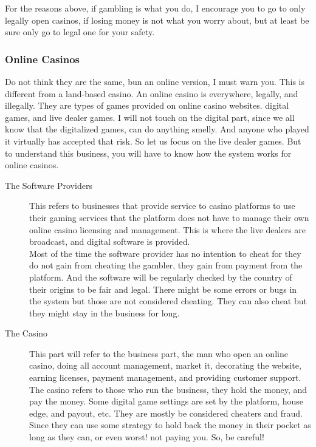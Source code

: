 \documentclass{article}
\begin{document}
For the reasons above, if gambling is what you do, I encourage you to go to only legally open casinos, if losing money is not what you worry about, but at least be sure only go to legal one for your safety.\\

\subsubsection{Online Casinos}
Do not think they are the same, bun an online version, I must warn you. This is different from a land-based casino.  An online casino is everywhere, legally, and illegally.  They are types of games provided on online casino websites. digital games, and live dealer games.  I will not touch on the digital part, since we all know that the digitalized games, can do anything smelly.  And anyone who played it virtually has accepted that risk.  So let us focus on the live dealer games.  But to understand this business, you will have to know how the system works for online casinos. \\
\begin{description}
\item[The Software Providers] This refers to businesses that provide service to casino platforms to use their gaming services that the platform does not have to manage their own online casino licensing and management. This is where the live dealers are broadcast, and digital software is provided.\\

Most of the time the software provider has no intention to cheat for they do not gain from cheating the gambler, they gain from payment from the platform.  And the software will be regularly checked by the country of their origins to be fair and legal.  There might be some errors or bugs in the system but those are not considered cheating.  They can also cheat but they might stay in the business for long.\\

\item[The Casino]  This part will refer to the business part, the man who open an online casino, doing all account management, market it, decorating the website, earning licenses, payment management, and providing customer support.\\

The casino refers to those who run the business, they hold the money, and pay the money.  Some digital game settings are set by the platform, house edge, and payout, etc.  They are mostly be considered cheaters and fraud.  Since they can use some strategy to hold back the money in their pocket as long as they can, or even worst! not paying you.  So, be careful!\\
\end{description}
\end{document}
